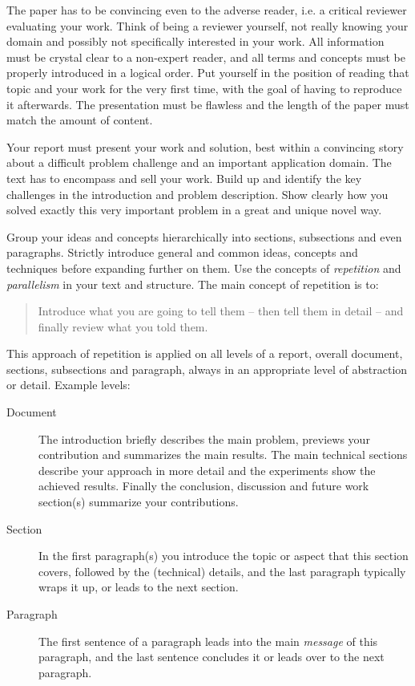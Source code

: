 \documentclass[11pt, a4paper,oneside,chapterprefix=false]{scrbook}
\begin{document}
The paper has to be convincing even to the adverse reader, i.e. a critical reviewer evaluating your work. Think of being a reviewer yourself, not really knowing your domain and possibly not specifically interested in your work. All information must be crystal clear to a non-expert reader, and all terms and concepts must be properly introduced in a logical order. Put yourself in the position of reading that topic and your work for the very first time, with the goal of having to reproduce it afterwards. The presentation must be flawless and the length of the paper must match the amount of content.

Your report must present your work and solution, best within a convincing story about a difficult problem challenge and an important application domain. The text has to encompass and sell your work. Build up and identify the key challenges in the introduction and problem description. Show clearly how you solved exactly this very important problem in a great and unique novel way.

Group your ideas and concepts hierarchically into sections, subsections and even paragraphs. Strictly introduce general and common ideas, concepts and techniques before expanding further on them. Use the concepts of \emph{repetition} and \emph{parallelism} in your text and structure. The main concept of repetition is to:

\begin{quotation}
Introduce what you are going to tell them -- then tell them in detail -- and finally review what you told them.
\end{quotation}

This approach of repetition is applied on all levels of a report, overall document, sections, subsections and paragraph, always in an appropriate level of abstraction or detail. Example levels:

\begin{description}
\item[Document] The introduction briefly describes the main problem, previews your contribution and summarizes the main results. The main technical sections describe your approach in more detail and the experiments show the achieved results. Finally the conclusion, discussion and future work section(s) summarize your contributions.
\item[Section] In the first paragraph(s) you introduce the topic or aspect that this section covers, followed by the (technical) details, and the last paragraph typically wraps it up, or leads to the next section.
\item[Paragraph] The first sentence of a paragraph leads into the main \emph{message} of this paragraph, and the last sentence concludes it or leads over to the next paragraph.
\end{description}
\end{document}

